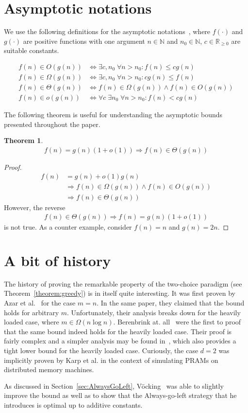 \documentclass[a4paper,12pt]{article}
\newtheorem{theorem}{Theorem}
\begin{document}
\section{Asymptotic notations}
\label{sec:asymptotic}
We use the following definitions for the asymptotic notations~\cite{CLRS01}, where $f(\cdot)$ and $g(\cdot)$ are positive functions with one argument $n\in \mathbb{N}$ and $n_0 \in \mathbb{N}$, $c \in \mathbb{R}_{\geq 0}$ are suitable constants.

\begin{align*}
f(n) \in O(g(n)) &\Leftrightarrow \exists c, n_0 \;\forall n> n_0: f(n)\leq c  g(n) \\
f(n) \in \Omega(g(n)) &\Leftrightarrow \exists c, n_0\;\forall n> n_0: cg(n) \leq f(n) \\
f(n) \in \Theta(g(n)) &\Leftrightarrow f(n) \in \Omega(g(n)) \land f(n)\in O(g(n)) \\
f(n) \in o(g(n)) &\Leftrightarrow \forall c \; \exists n_0\;\forall n> n_0: f(n) < cg(n)
\end{align*}

The following theorem is useful for understanding the asymptotic bounds presented throughout the paper.
\begin{theorem}\label{theorem:asymptotic}
\begin{align*}
f(n) = g(n)  (1+o(1)) \Rightarrow f(n) \in \Theta(g(n)) 
\end{align*}
\end{theorem}
\begin{proof}
\begin{align*}
f(n) &= g(n)+o(1) g(n) \\
&\Rightarrow f(n) \in \Omega(g(n)) \land f(n) \in O(g(n)) \\
&\Rightarrow f(n) \in \Theta(g(n))
\end{align*}
However, the reverse
\begin{align*}
f(n) \in \Theta(g(n)) \Rightarrow f(n) = g(n)  (1+o(1)) 
\end{align*}
is not true. As a counter example, consider $f(n) = n$ and $g(n) = 2n$.
\end{proof}

\section{A bit of history}
\label{sec:historyOfGreedy}
The history of proving the remarkable property of the two-choice paradigm (see Theorem~\ref{theorem:greedy}) is in itself quite interesting. It was first proven by Azar et al.~\cite{ABKU99} for the case $m = n$. In the same paper, they claimed that the bound holds for arbitrary $m$. Unfortunately, their analysis breaks down for the heavily loaded case, where $m \in \Omega\left(n  \log n\right)$. Berenbrink at. all~\cite{BCSV06} were the first to proof that the same bound indeed holds for the heavily loaded case. Their proof is fairly complex and a simpler analysis may be found in~\cite{TW13}, which also provides a tight lower bound for the heavily loaded case. Curiously, the case $d = 2$ was implicitly proven by Karp et al. in the context of simulating PRAMs on distributed memory machines\cite{KLM92}.

As discussed in Section~\ref{sec:AlwaysGoLeft}, V\"ocking~\cite{VOC03} was able to slightly improve the bound as well as to show that the Always-go-left strategy that he introduces is optimal up to additive constants.



 
\end{document}
